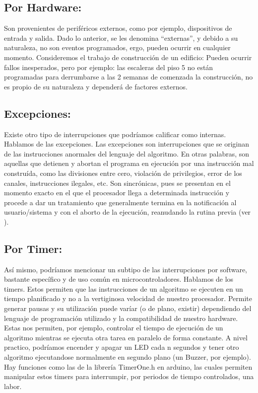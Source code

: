 \documentclass[12pt]{article}
\begin{document}
\begin{multicols}{2}
\section*{Por Hardware: }
 Son provenientes de periféricos externos, como por ejemplo, dispositivos de entrada y salida. Dado lo anterior, se les denomina “externas”, y debido a su naturaleza, no son eventos programados, ergo, pueden ocurrir en cualquier momento. Consideremos el trabajo de  construcción de un edificio: Pueden ocurrir fallos inesperados, pero por ejemplo: las escaleras del piso 5 no están programadas para derrumbarse a las 2 semanas de comenzada la construcción, no es propio de su naturaleza y dependerá de factores externos.
 \subsection*{Excepciones: }
Existe otro tipo de interrupciones que podríamos calificar como internas. Hablamos de las excepciones. Las excepciones son interrupciones que se originan de las instrucciones anormales del lenguaje del algoritmo. En otras palabras, son aquellas que detienen y abortan el programa en ejecución por una instrucción mal construída, como las divisiones entre cero, violación de privilegios, error de los canales, instrucciones ilegales, etc. Son sincrónicas, pues se presentan en el momento exacto en el que el procesador llega a determinada instrucción y procede a dar un tratamiento que generalmente termina en la notificación al usuario/sistema y con el aborto de la ejecución, reanudando la rutina previa (ver \cite{Upm}).
 \subsection*{Por Timer: }
Así mismo, podríamos mencionar un subtipo de las interrupciones por software, bastante específico y de uso común en microcontroladores. Hablamos de los timers. Estos permiten que las instrucciones de un algoritmo se ejecuten en un tiempo planificado y no a la vertiginosa velocidad de nuestro procesador. Permite generar pausas y su utilización puede varíar (o de plano, existir) dependiendo del lenguaje de programación utilizado y la compatibilidad de nuestro hardware. Estas nos permiten, por ejemplo, controlar el tiempo de ejecución de un algoritmo mientras se ejecuta otra tarea en paralelo de forma constante. A nivel practico, podríamos encender y apagar un LED cada n segundos y tener otro algoritmo ejecutandose normalmente en segundo plano (un Buzzer, por ejemplo). Hay funciones como las de la librería TimerOne.h en arduino, las cuales permiten manipular estos timers para interrumpir, por periodos de tiempo controlados, una labor.


\end{multicols}
\end{document}
